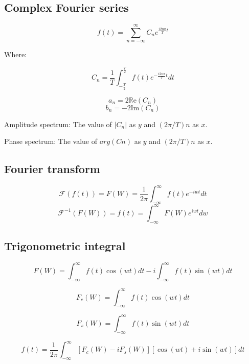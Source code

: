\documentclass[letterpaper]{article}
\newcommand{\divline}{\noindent\makebox[\linewidth]{\rule{\textwidth}{0.4pt}}}
\begin{document}
        \divline

        \begin{multicols}{2}

            \section{Complex Fourier series}

                \[f(t) = \sum_{n = - \infty}^{\infty} C_{n} e^{\frac{i2n\pi}{T} t} \]

                Where:

                \[C_{n} = \frac{1}{T} \int_{-\frac{T}{2}}^{\frac{T}{2}} f(t) e^{-\frac{i2n\pi}{T}t} dt \]

                \[a_{n} = 2 \mathbb{R}\text{e}(C_{n})\]
                \[b_{n} = - 2 \mathbb{I}\text{m}(C_{n})\]

                Amplitude spectrum: The value of \(|C_{n}|\) as \(y\) and \((2\pi/T)n\) as \(x\).

                Phase spectrum: The value of \(arg(Cn)\) as \(y\) and \((2\pi/T)n\) as \(x\).

        \end{multicols}

        \divline

        \begin{multicols}{2}

            \section{Fourier transform}

                \[\mathcal{F} (f(t)) = F(W) = \frac{1}{2\pi} \int_{-\infty}^{\infty} f(t) e^{-iwt} dt \]
                \[\mathcal{F}^{-1} (F(W)) = f(t) = \int_{-\infty}^{\infty} F(W) e^{iwt} dw \]
        
        \end{multicols}

        \divline

        \begin{multicols}{2}
            \section{Trigonometric integral}

                \[F(W) = \int_{-\infty}^{\infty} f(t) \cos(wt) dt -i \int_{-\infty}^{\infty} f(t) \sin(wt) dt \]

                \[F_{c}(W) = \int_{-\infty}^{\infty} f(t) \cos(wt) dt  \]
                
                \[F_{s}(W) = \int_{-\infty}^{\infty} f(t) \sin(wt) dt  \]

                \[f(t) = \frac{1}{2\pi} \int_{-\infty}^{\infty} [F_{c}(W) - i F_{s}(W)][\cos(wt) + i \sin(wt)] dt \]

        \end{multicols}
\end{document}
